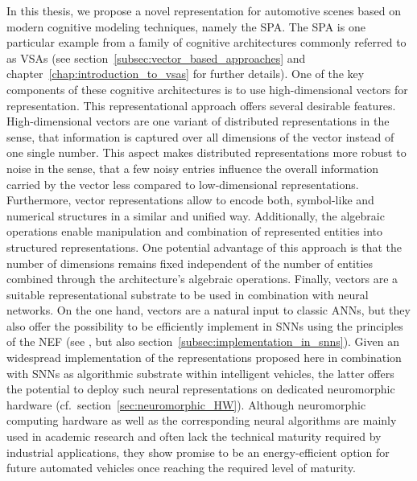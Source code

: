 In this thesis, we propose a novel representation for automotive scenes based on modern cognitive modeling techniques, namely the \ac{SPA}.
The \ac{SPA} is one particular example from a family of cognitive architectures commonly referred to as \acp{VSA} (see section~\ref{subsec:vector_based_approaches} and chapter~\ref{chap:introduction_to_vsas} for further details).
One of the key components of these cognitive architectures is to use high-dimensional vectors for representation.
This representational approach offers several desirable features.
High-dimensional vectors are one variant of distributed representations in the sense, that information is captured over all dimensions of the vector instead of one single number.
This aspect makes distributed representations more robust to noise in the sense, that a few noisy entries influence the overall information carried by the vector less compared to low-dimensional representations.
Furthermore, vector representations allow to encode both, symbol-like and numerical structures in a similar and unified way.
Additionally, the algebraic operations enable manipulation and combination of represented entities into structured representations.
One potential advantage of this approach is that the number of dimensions remains fixed independent of the number of entities combined through the architecture's algebraic operations.
Finally, vectors are a suitable representational substrate to be used in combination with neural networks.
On the one hand, vectors are a natural input to classic \acp{ANN}, but they also offer the possibility to be efficiently implement in \acp{SNN} using the principles of the \ac{NEF} (see \cite{Eliasmith2013}, but also section~\ref{subsec:implementation_in_snns}).
Given an widespread implementation of the representations proposed here in combination with \acp{SNN} as algorithmic substrate within intelligent vehicles, the latter offers the potential to deploy such neural representations on dedicated neuromorphic hardware (cf.\ section~\ref{sec:neuromorphic_HW}).
Although neuromorphic computing hardware as well as the corresponding neural algorithms are mainly used in academic research and often lack the technical maturity required by industrial applications, they show promise to be an energy-efficient option for future automated vehicles once reaching the required level of maturity.

